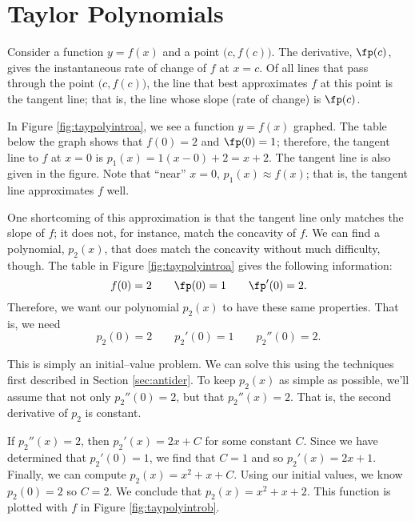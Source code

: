\section{Taylor Polynomials}\label{sec:taylor_poly}

Consider a function $y=f(x)$ and a point $\big(c,f(c)\big)$. The derivative, $\fp(c)$, gives the instantaneous rate of change of $f$ at $x=c$. Of all lines that pass through the point $\big(c,f(c)\big)$, the line that best approximates $f$ at this point is the tangent line; that is, the line whose slope (rate of change) is $\fp(c)$.

In Figure \ref{fig:taypolyintroa}, we see a function $y=f(x)$ graphed. The table below the graph shows that $f(0)=2$ and $\fp(0) = 1$; therefore, the tangent line to $f$ at $x=0$ is $p_1(x) = 1(x-0)+2 = x+2$. The tangent line is also given in the figure. Note that ``near'' $x=0$, $p_1(x) \approx f(x)$; that is, the tangent line approximates $f$ well.


One shortcoming of this approximation is that the tangent line only matches the slope of $f$; it does not, for instance, match the concavity of $f$. We can find a polynomial, $p_2(x)$, that does match the concavity without much difficulty, though. The table in Figure \ref{fig:taypolyintroa} gives the following information:
$$f(0) = 2 \qquad \fp(0) = 1\qquad \fp'(0) = 2.$$
Therefore, we want our polynomial $p_2(x)$ to have these same properties. That is, we need $$p_2(0) = 2 \qquad p_2'(0) = 1 \qquad p_2''(0) = 2.$$

This is simply an initial--value problem. We can solve this using the techniques first described in Section \ref{sec:antider}. To keep $p_2(x)$ as simple as possible, we'll assume that not only  $p_2''(0)=2$, but that $p_2''(x)=2$. That is, the second derivative of $p_2$ is  constant.

If $p_2''(x) = 2$, then $p_2'(x) = 2x+C$ for some constant $C$. Since we have determined that $p_2'(0) = 1$, we find that $C=1$ and so $p_2'(x) = 2x+1$. Finally, we can compute $p_2(x) = x^2+x+C$. Using our initial values, we know $p_2(0) = 2$ so $C=2.$ We conclude that $p_2(x) = x^2+x+2.$ This function is plotted with $f$ in Figure \ref{fig:taypolyintrob}.


